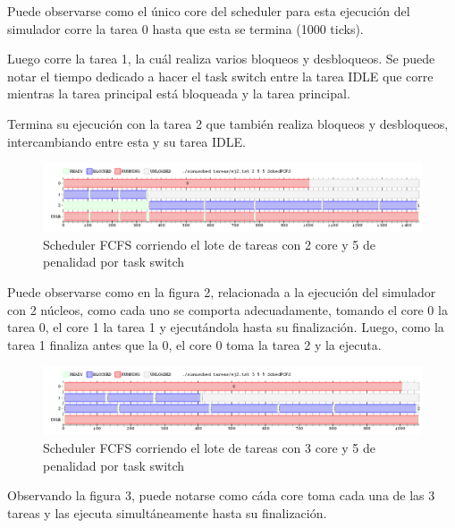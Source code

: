 \documentclass[a4paper,10pt,twoside]{article}
\begin{document}
Puede observarse como el único core del scheduler para esta ejecución del simulador corre la tarea 0 hasta que esta se termina (1000 ticks).

Luego corre la tarea 1, la cuál realiza varios bloqueos y desbloqueos. Se puede notar el tiempo dedicado a hacer el task switch entre la tarea IDLE que corre mientras la tarea principal está bloqueada y la tarea principal.

Termina su ejecución con la tarea 2 que también realiza bloqueos y desbloqueos, intercambiando entre esta y su tarea IDLE.

\begin{figure}[ht!]
\centering
\includegraphics[width=175mm]{../ejercicio2/FCFS2Core.png}
\caption{Scheduler FCFS corriendo el lote de tareas con 2 core y 5 de penalidad por task switch}
\label{overflow}
\end{figure}

Puede observarse como en la figura 2, relacionada a la ejecución del simulador con 2 núcleos, como cada uno se comporta adecuadamente, tomando el core 0 la tarea 0, el core 1 la tarea 1 y ejecutándola hasta su finalización. Luego, como la tarea 1 finaliza antes que la 0, el core 0 toma la tarea 2 y la ejecuta.

\begin{figure}[ht!]
\centering
\includegraphics[width=175mm]{../ejercicio2/FCFS3Core.png}
\caption{Scheduler FCFS corriendo el lote de tareas con 3 core y 5 de penalidad por task switch}
\label{overflow}
\end{figure}

Observando la figura 3, puede notarse como cáda core toma cada una de las 3 tareas y las ejecuta simultáneamente hasta su finalización.

\end{document}
